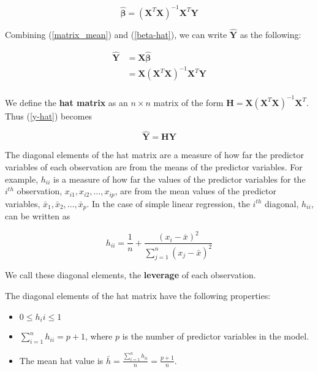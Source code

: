\documentclass[]{book}
\providecommand{\tightlist}{%
  \setlength{\itemsep}{0pt}\setlength{\parskip}{0pt}}
\begin{document}
\begin{equation}
\label{beta-hat}
\hat{\boldsymbol{\beta}} = (\mathbf{X}^T\mathbf{X})^{-1}\mathbf{X}^T\mathbf{Y}
\end{equation}

Combining (\ref{matrix_mean}) and (\ref{beta-hat}), we can write
\(\hat{\mathbf{Y}}\) as the following:

\begin{equation}
\label{y-hat}
\begin{aligned}
\hat{\mathbf{Y}} &= \mathbf{X}\hat{\boldsymbol{\beta}} \\[10pt]
&= \mathbf{X}(\mathbf{X}^T\mathbf{X})^{-1}\mathbf{X}^T\mathbf{Y}\\
\end{aligned}
\end{equation}

We define the \textbf{hat matrix} as an \(n \times n\) matrix of the
form
\(\mathbf{H} = \mathbf{X}(\mathbf{X}^T\mathbf{X})^{-1}\mathbf{X}^T\).
Thus (\ref{y-hat}) becomes

\begin{equation}
\label{y-hat-matrix}
\hat{\mathbf{Y}} = \mathbf{H}\mathbf{Y}
\end{equation}

The diagonal elements of the hat matrix are a measure of how far the
predictor variables of each observation are from the means of the
predictor variables. For example, \(h_{ii}\) is a measure of how far the
values of the predictor variables for the \(i^{th}\) observation,
\(x_{i1}, x_{i2}, \ldots, x_{ip}\), are from the mean values of the
predictor variables, \(\bar{x}_1, \bar{x}_2, \ldots, \bar{x}_p\). In the
case of simple linear regression, the \(i^{th}\) diagonal, \(h_{ii}\),
can be written as

\[h_{ii} =  \frac{1}{n} + \frac{(x_i - \bar{x})^2}{\sum_{j=1}^{n}(x_j-\bar{x})^2}\]

We call these diagonal elements, the \textbf{leverage} of each
observation.

The diagonal elements of the hat matrix have the following properties:

\begin{itemize}
\tightlist
\item
  \(0 \leq h_ii \leq 1\)
\item
  \(\sum\limits_{i=1}^{n} h_{ii} = p+1\), where \(p\) is the number of
  predictor variables in the model.
\item
  The mean hat value is
  \(\bar{h} = \frac{\sum\limits_{i=1}^{n} h_{ii}}{n} = \frac{p+1}{n}\).
\end{itemize}
\end{document}

